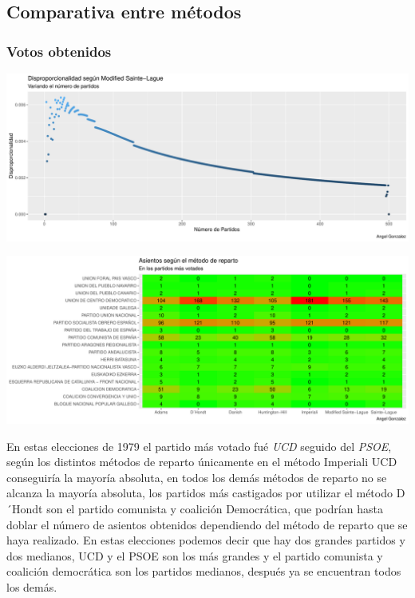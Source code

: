 \documentclass[12pt,a4paper,]{book}
\numberwithin{dummy}{section}
\theoremstyle{ocrenumbox}
\theoremstyle{blacknumex}
\theoremstyle{blacknumbox}
\theoremstyle{ocrenum}
\theoremstyle{ocrenum}
\begin{document}
\hypertarget{comparativa-entre-muxe9todos-1}{%
\subsection{Comparativa entre
métodos}\label{comparativa-entre-muxe9todos-1}}

\hypertarget{votos-obtenidos-1}{%
\subsubsection{Votos obtenidos}\label{votos-obtenidos-1}}

\begin{center}\includegraphics[width=0.95\linewidth]{figurasR/unnamed-chunk-20-1} \end{center}

\begin{center}\includegraphics[width=0.95\linewidth]{figurasR/unnamed-chunk-20-2} \end{center}

En estas elecciones de 1979 el partido más votado fué \emph{UCD} seguido
del \emph{PSOE}, según los distintos métodos de reparto únicamente en el
método Imperiali UCD conseguiría la mayoría absoluta, en todos los demás
métodos de reparto no se alcanza la mayoría absoluta, los partidos más
castigados por utilizar el método D´Hondt son el partido comunista y
coalición Democrática, que podrían hasta doblar el número de asientos
obtenidos dependiendo del método de reparto que se haya realizado. En
estas elecciones podemos decir que hay dos grandes partidos y dos
medianos, UCD y el PSOE son los más grandes y el partido comunista y
coalición democrática son los partidos medianos, después ya se
encuentran todos los demás.
\end{document}
